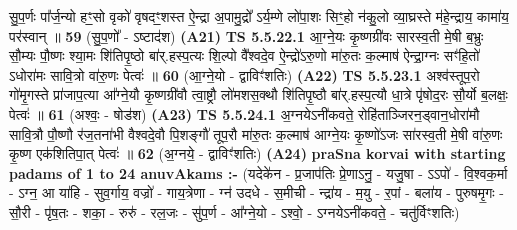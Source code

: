 \documentclass[17pt]{extarticle}
\begin{document}
                  सु॒प॒र्णः पा᳚र्ज॒न्यो हꣳ॒॒सो वृको॑ वृषदꣳ॒॒शस्त ऐ॒न्द्रा अ॒पामु॒द्रो᳚ ऽर्य॒म्णे लो॑पा॒शः सिꣳ॒॒हो न॑कु॒लो व्या॒घ्रस्ते म॑हे॒न्द्राय॒ कामा॑य॒ पर॑स्वान् ॥ \textbf{  59} \newline
                  \newline
                      (सु॒प॒णो᳚ - ऽष्टाद॑श)  \textbf{(A21)} \newline \newline
                                        \textbf{ TS 5.5.22.1} \newline
                  आ॒ग्ने॒यः कृ॒ष्णग्री॑वः सारस्व॒ती मे॒षी ब॒भ्रुः सौ॒म्यः पौ॒ष्णः श्या॒मः शि॑तिपृ॒ष्ठो बा॑र्.हस्प॒त्यः शि॒ल्पो वै᳚श्वदे॒व ऐ॒न्द्रो॑ऽरु॒णो मा॑रु॒तः क॒ल्माष॑ ऐन्द्रा॒ग्नः सꣳ॑हि॒तो॑ ऽधोरा॑मः सावि॒त्रो वा॑रु॒णः पेत्वः॑ ॥ \textbf{  60} \newline
                  \newline
                      (आ॒ग्ने॒यो - द्वाविꣳ॑शतिः)  \textbf{(A22)} \newline \newline
                                        \textbf{ TS 5.5.23.1} \newline
                  अश्व॑स्तूप॒रो गो॑मृ॒गस्ते प्रा॑जाप॒त्या आ᳚ग्ने॒यौ कृ॒ष्णग्री॑वौ त्वा॒ष्ट्रौ लो॑मशस॒क्थौ शि॑तिपृ॒ष्ठौ बा॑र्.हस्प॒त्यौ धा॒त्रे पृ॑षोद॒रः सौ॒र्यो ब॒लक्षः॒ पेत्वः॑ ॥ \textbf{  61 } \newline
                  \newline
                      (अश्वः॒ - षोड॑श)  \textbf{(A23)} \newline \newline
                                        \textbf{ TS 5.5.24.1} \newline
                  अ॒ग्नयेऽनी॑कवते॒ रोहि॑ताञ्जिरन॒ड्वान॒धोरा॑मौ सावि॒त्रौ पौ॒ष्णौ र॑ज॒तना॑भी वैश्वदे॒वौ पि॒शङ्गौ॑ तूप॒रौ मा॑रु॒तः क॒ल्माष॑ आग्ने॒यः कृ॒ष्णो॑ऽजः सा॑रस्व॒ती मे॒षी वा॑रु॒णः कृ॒ष्ण एक॑शितिपा॒त् पेत्वः॑ ॥ \textbf{  62} \newline
                  \newline
                      (अ॒ग्नये॒ - द्वाविꣳ॑शतिः)  \textbf{(A24)} \newline \newline
                \textbf{praSna korvai with starting padams of 1 to 24 anuvAkams :-} \newline
        (यदेके॑न - प्र॒जाप॑तिः प्रे॒णाऽनु॒ - यजु॒षा - ऽऽपो॑ - वि॒श्वक॒र्मा - ऽग्न॒ आ या॑हि - सुव॒र्गाय॒ वज्रो॑ - गाय॒त्रेणा - ग्न॑ उदधे - स॒मीची - न्द्रा॑य - म॒यु - र॒पां - बला॑य - पुरुषमृ॒गः - सौ॒री - पृ॑ष॒तः - शका॒ - रुरु॑ - रल॒जः - सु॑प॒र्ण - आ᳚ग्ने॒यो - ऽश्वो॒ - ऽग्नयेऽनी॑कवते॒ - चतु॑र्विꣳशतिः) \newline
\end{document}
